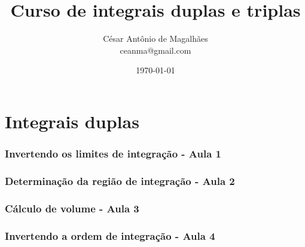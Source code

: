 \documentclass[12pt, a4paper]{article}
\title{Curso de integrais duplas e triplas}
\author{César Antônio de Magalhães \\ ceanma@gmail.com}
\date{\today}
\begin{document}
	\maketitle\newpage
	
	\tableofcontents\newpage
	
	
	\listoffigures\newpage
	
	
	\part{Integrais duplas}	
		\section{Invertendo os limites de integração - Aula 1}			
					
		\section{Determinação da região de integração - Aula 2}		
					
		\section{Cálculo de volume - Aula 3}
					
		\section{Invertendo a ordem de integração - Aula 4}
			
		
		
		
		
\end{document}
